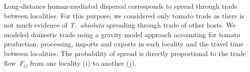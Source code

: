 \documentclass[11pt]{article}
\newcommand{\tuta}{\emph{T.~absoluta}}
\newcommand{\infest}{\rho}
\newcommand{\suitable}{\epsilon}
\theoremstyle{definition}
\begin{document}
Long-distance human-mediated dispersal corresponds to spread through trade
between localities. For this purpose, we considered only tomato trade as
there is not much evidence of \tuta{} spreading through trade of other
hosts. We modeled domestic trade using a gravity model approach accounting
for tomato production, processing, imports and exports in each locality and
the travel time between localities. 
The probability of spread is directly proportional to the trade
flow~$F_{ij}$ from one locality ($i$) to another ($j$).
\end{document}
